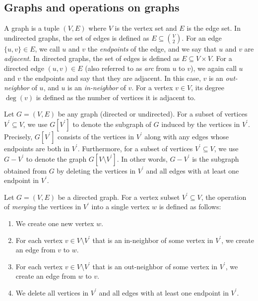 \documentclass[
    12pt,               %
    a4paper,            %
    bibtotoc,           %
    pointlessnumbers,   %
    ngerman,            %
    titlepage,          %
    leqno,              %
    ]{scrarticle}       %
\begin{document}
\subsection{Graphs and operations on graphs}

A graph is a tuple $(V, E)$ where $V$ is the vertex set and $E$ is the edge set. In undirected graphs, the set of edges is defined as $E \subseteq \binom{V}{2}$. For an edge $\{u, v\} \in E$, we call $u$ and $v$ the \emph{endpoints} of the edge, and we say that $u$ and $v$ are \emph{adjacent}. In directed graphs, the set of edges is defined as $E \subseteq V \times V$. For a directed edge $(u, v) \in E$ (also referred to as \emph{arc} from $u$ to $v$), we again call $u$ and $v$ the endpoints and say that they are adjacent. In this case, $v$ is an \emph{out-neighbor} of $u$, and $u$ is an \emph{in-neighbor} of $v$. For a vertex $v \in V$, its degree $\operatorname{deg}(v)$ is defined as the number of vertices it is adjacent to.

Let $G = (V, E)$ be any graph (directed or undirected). For a subset of vertices $V^\prime \subseteq V$, we use $G[V^\prime]$ to denote the subgraph of $G$ induced by the vertices in $V^\prime$. Precisely, $G[V^\prime]$ consists of the vertices in $V^\prime$ along with any edges whose endpoints are both in $V^\prime$. Furthermore, for a subset of vertices $V^\prime \subseteq V$, we use $G - V^\prime$ to denote the graph $G[V \setminus V^\prime]$. In other words, $G - V^\prime$ is the subgraph obtained from $G$ by deleting the vertices in $V^\prime$ and all edges with at least one endpoint in $V^\prime$.

Let $G = (V, E)$ be a directed graph. For a vertex subset $V^\prime \subseteq V$, the operation of \emph{merging} the vertices in $V^\prime$ into a single vertex $w$ is defined as follows:
\begin{enumerate}[nolistsep]
\item
We create one new vertex $w$.
\item
For each vertex $v \in V \setminus V^\prime$ that is an in-neighbor of some vertex in $V^\prime$, we create an edge from $v$ to $w$.
\item
For each vertex $v \in V \setminus V^\prime$ that is an out-neighbor of some vertex in $V^\prime$, we create an edge from $w$ to $v$.
\item
We delete all vertices in $V^\prime$ and all edges with at least one endpoint in $V^\prime$.
\end{enumerate}
\end{document}
